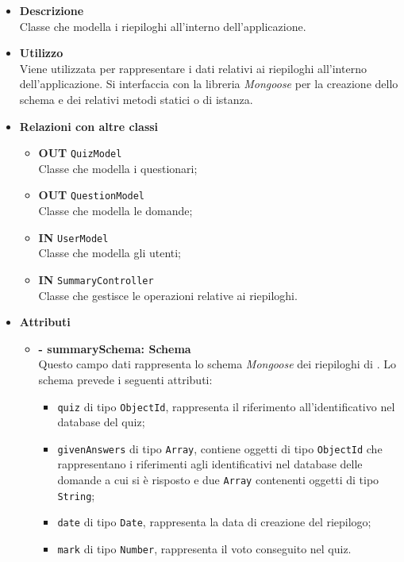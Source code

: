 \begin{itemize}
	\item \textbf{Descrizione} \\
	Classe che modella i riepiloghi all'interno dell'applicazione.
	\item \textbf{Utilizzo} \\
	Viene utilizzata per rappresentare i dati relativi ai riepiloghi all'interno dell'applicazione. Si interfaccia con la libreria \textit{Mongoose} per la creazione dello schema e dei relativi metodi statici o di istanza.
	\item \textbf{Relazioni con altre classi}
		\begin{itemize}
			\item \textbf{OUT} \texttt{QuizModel}\\
			Classe che modella i questionari;
			\item \textbf{OUT} \texttt{QuestionModel}\\
			Classe che modella le domande;
			\item \textbf{IN} \texttt{UserModel}\\
			Classe che modella gli utenti;
			\item \textbf{IN} \texttt{SummaryController}\\
			Classe che gestisce le operazioni relative ai riepiloghi.
		\end{itemize}
	\item \textbf{Attributi}
		\begin{itemize}
			\item \textbf{- summarySchema: Schema} \\
			Questo campo dati rappresenta lo schema \textit{Mongoose} dei riepiloghi di \progetto. Lo schema prevede i seguenti attributi:
				\begin{itemize}
					\item \texttt{quiz} di tipo \texttt{ObjectId}, rappresenta il riferimento all'identificativo nel database del quiz;
					\item \texttt{givenAnswers} di tipo \texttt{Array}, contiene oggetti di tipo \texttt{ObjectId} che rappresentano i riferimenti agli identificativi nel database delle domande a cui si è risposto e due \texttt{Array} contenenti oggetti di tipo \texttt{String};	
					\item \texttt{date} di tipo \texttt{Date}, rappresenta la data di creazione del riepilogo;
					\item \texttt{mark} di tipo \texttt{Number}, rappresenta il voto conseguito nel quiz.

\end{itemize}
\end{itemize}
\end{itemize}
